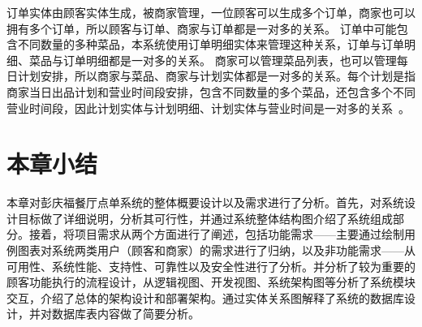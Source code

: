 订单实体由顾客实体生成，被商家管理，一位顾客可以生成多个订单，商家也可以拥有多个订单，所以顾客与订单、商家与订单都是一对多的关系。
订单中可能包含不同数量的多种菜品，本系统使用订单明细实体来管理这种关系，订单与订单明细、菜品与订单明细都是一对多的关系。
商家可以管理菜品列表，也可以管理每日计划安排，所以商家与菜品、商家与计划实体都是一对多的关系。每个计划是指商家当日出品计划和营业时间段安排，包含不同数量的多个菜品，还包含多个不同营业时间段，因此计划实体与计划明细、计划实体与营业时间是一对多的关系~\cite{DBLP:conf/socpar/ShimmuraTA09}。

\section{本章小结}
本章对彭庆福餐厅点单系统的整体概要设计以及需求进行了分析。首先，对系统设计目标做了详细说明，分析其可行性，并通过系统整体结构图介绍了系统组成部分。接着，将项目需求从两个方面进行了阐述，包括功能需求——主要通过绘制用例图表对系统两类用户（顾客和商家）的需求进行了归纳，以及非功能需求——从可用性、系统性能、支持性、可靠性以及安全性进行了分析。并分析了较为重要的顾客功能执行的流程设计，从逻辑视图、开发视图、系统架构图等分析了系统模块交互，介绍了总体的架构设计和部署架构。通过实体关系图解释了系统的数据库设计，并对数据库表内容做了简要分析。